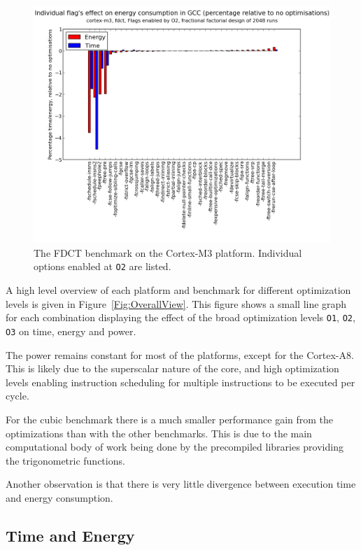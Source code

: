 \documentclass[twocolumn]{article}
\begin{document}
\begin{figure}[tb]
	\includegraphics[width=\linewidth]{cortex-m3/O2_main_effects_fdct.png}
	\caption{The FDCT benchmark on the Cortex-M3 platform. Individual options enabled at \texttt{O2} are listed.}
	\label{Fig:FdctO2MainEffects}
\end{figure}

A high level overview of each platform and benchmark for different optimization levels is given in Figure~\ref{Fig:OverallView}. This figure shows a small line graph for each combination displaying the effect of the broad optimization levels \texttt{O1}, \texttt{O2}, \texttt{O3} on time, energy and power.

The power remains constant for most of the platforms, except for the Cortex-A8. This is likely due to the superscalar nature of the core, and high optimization levels enabling instruction scheduling for multiple instructions to be executed per cycle.

For the cubic benchmark there is a much smaller performance gain from the optimizations than with the other benchmarks. This is due to the main computational body of work being done by the precompiled libraries providing the trigonometric functions.

Another observation is that there is very little divergence between execution time and energy consumption.

\subsection*{Time and Energy}
\end{document}
